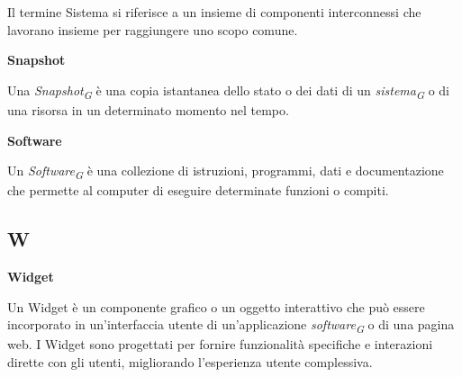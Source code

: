 \vspace{0.1cm}

Il termine Sistema si riferisce a un insieme di componenti interconnessi che lavorano insieme per raggiungere uno scopo comune.

\vspace{0.4cm}

\textbf{Snapshot}

\vspace{0.1cm}

Una \textit{Snapshot}\textsubscript{\textit{G}} è una copia istantanea dello stato o dei dati di un \textit{sistema}\textsubscript{\textit{G}} o di una risorsa in un determinato momento nel tempo. 

\vspace{0.4cm}

\textbf{Software}

\vspace{0.1cm}

Un \textit{Software}\textsubscript{\textit{G}} è una collezione di istruzioni, programmi, dati e documentazione che permette al computer di eseguire determinate funzioni o compiti.

\subsection{W}

\vspace{0.4cm}

\textbf{Widget}

\vspace{0.1cm}

Un Widget è un componente grafico o un oggetto interattivo che può essere incorporato in un'interfaccia utente di un'applicazione \textit{software}\textsubscript{\textit{G}} o di una pagina web. I Widget sono progettati per fornire funzionalità specifiche e interazioni dirette con gli utenti, migliorando l'esperienza utente complessiva.



